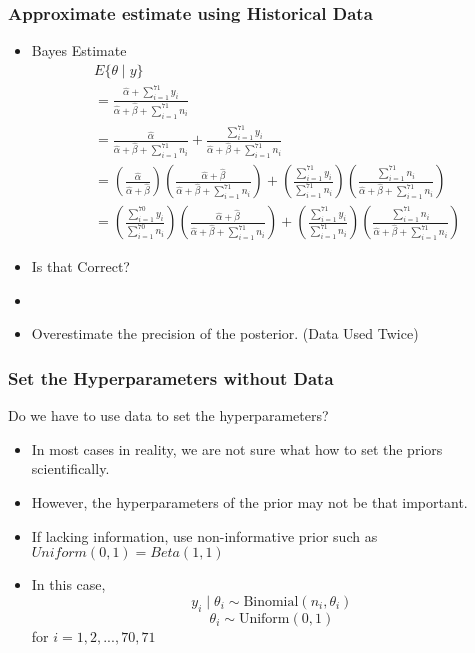 \documentclass{beamer}
\begin{document}

\begin{frame}
\frametitle{Approximate estimate using Historical Data}
\begin{itemize}
\item Bayes Estimate $$\begin{aligned}&E\{\theta \mid y\}\\ 
&= \frac{\hat{\alpha} +  \sum_{i = 1}^{71} y_i}{\hat{\alpha} +\hat{\beta} + \sum_{i = 1}^{71}n_{i}} \\
&= \frac{\hat{\alpha}}{\hat{\alpha} +\hat{\beta} + \sum_{i = 1}^{71}n_{i}} +  \frac{ \sum_{i = 1}^{71} y_i}{\hat{\alpha} +\hat{\beta} + \sum_{i = 1}^{71}n_{i}}\\
&= (\frac{\hat{\alpha}}{\hat{\alpha} +\hat{\beta}})(\frac{\hat{\alpha} + \hat{\beta}}{\hat{\alpha} +\hat{\beta} + \sum_{i = 1}^{71}n_{i}}) + (\frac{\sum_{i = 1}^{71} y_i}{\sum_{i = 1}^{71}n_{i}})(\frac{\sum_{i = 1}^{71}n_{i}}{\hat{\alpha} +\hat{\beta} + \sum_{i = 1}^{71}n_{i}})\\
&=  (\frac{\sum_{i = 1}^{70} y_i}{\sum_{i = 1}^{70}n_{i}})(\frac{\hat{\alpha} + \hat{\beta}}{\hat{\alpha} +\hat{\beta} + \sum_{i = 1}^{71}n_{i}}) + (\frac{\sum_{i = 1}^{71} y_i}{\sum_{i = 1}^{71}n_{i}})(\frac{\sum_{i = 1}^{71}n_{i}}{\hat{\alpha} +\hat{\beta} + \sum_{i = 1}^{71}n_{i}})
\end{aligned}$$
\item Is that Correct?
\item {}
\item Overestimate the precision of the posterior. (Data Used Twice)
\end{itemize}
\end{frame}

\begin{frame}
\frametitle{Set the Hyperparameters without Data}
\begin{block}{Do we have to use data to set the hyperparameters?}
\begin{itemize}
\item In most cases in reality, we are not sure what how to set the priors scientifically.
\item However, the hyperparameters of the prior may not be that important.
\item If lacking information, use non-informative prior such as $Uniform(0,1) = Beta(1,1)$
\item In this case,
$$y_i \mid \theta_i \sim \text{Binomial}(n_i,\theta_i) $$
$$\theta_i \sim \text{Uniform}(0,1)$$ for $i = 1,2,...,70,71$
\end{itemize}
\end{block}
\end{frame}
\end{document}
